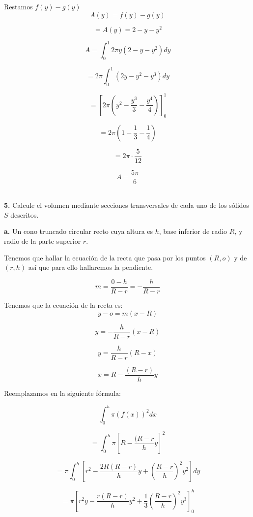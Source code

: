 \documentclass[12pt]{article}
\begin{document}
\begin{flushleft}
Restamos $f(y)-g(y)$\\


$$A(y) = f(y)-g(y)$$

$$=A(y) =2-y-y^{2}$$


$$A =\int_{0}^{1} 2\pi y \left ( 2-y-y^{2} \right )dy$$

$$=2\pi \int_{0}^{1}\left ( 2y-y^2-y^3 \right )dy$$

$$=\left[ 2\pi \left ( y^2-\frac{y^3}{3}-\frac{y^4}{4} \right ) \right]_{0}^{1}$$

$$=2\pi \left ( 1-\frac{1}{3}-\frac{1}{4} \right )$$

$$=2\pi \cdot \frac{5}{12}$$

$$A=\frac{5\pi}{6}$$\\
\vspace{0.5cm}

\textbf{5.} Calcule el volumen mediante secciones transversales de cada uno de los sólidos $S$ descritos.\\

\vspace{0.5cm}

\textbf{a.} Un cono truncado circular recto cuya altura es $h$, base inferior de radio $R$, y radio de la parte superior $r$.\\
\vspace{0.5cm}


Tenemos que hallar la ecuación de la recta que pasa por los puntos $(R,o)$ y de $(r,h)$ así que para ello hallaremos la pendiente.

$$m=\frac{0-h}{R-r}=-\frac{h}{R-r}$$

Tenemos que la ecuación de la recta es:\\

$$y-o=m\left(x-R\right)$$

$$y=-\frac{h}{R-r}\left(x-R\right)$$

$$y=\frac{h}{R-r}\left(R-x\right)$$

$$x=R-\frac{\left(R-r\right)}{h}y$$

Reemplazamos en la siguiente fórmula:\\
\vspace{0.5cm}


$$\int_{0}^{h}\pi \left ( f(x) \right )^{2}dx$$

$$=\int_{0}^{h}\pi \left[R-\frac{(R-r}{h}y\right]^{2}$$

$$=\pi\int_{0}^{h}\left[r^{2}-\frac{2R(R-r)}{h}y+\left(\frac{R-r}{h}\right)^{2}y^{2}\right]dy$$

$$=\pi\left[r^{2}y-\frac{r(R-r)}{h}y^{2}+\frac{1}{3}\left(\frac{R-r}{h}\right)^{2}y^{3}\right]_{0}^{h}$$


\end{flushleft}
\end{document}
